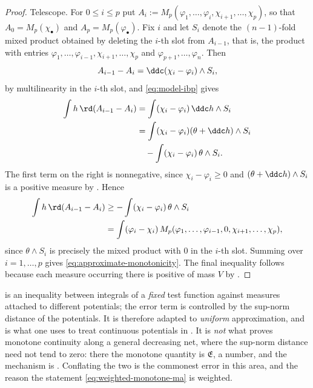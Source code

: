 \begin{proof}
Telescope.  For \(0\leq i\leq p\) put
\(A_i:=M_p(\varphi_1,\ldots,\varphi_i,\chi_{i+1},\ldots,\chi_p)\), so that
\(A_0=M_p(\chi_\bullet)\) and \(A_p=M_p(\varphi_\bullet)\).  Fix \(i\) and
let \(S_i\) denote the \((n-1)\)-fold mixed product obtained by deleting the
\(i\)-th slot from \(A_{i-1}\), that is, the product with entries
\(\varphi_1,\ldots,\varphi_{i-1},\chi_{i+1},\ldots,\chi_p\) and
\(\varphi_{p+1},\ldots,\varphi_n\).  Then
\[
 A_{i-1}-A_i=\ddc(\chi_i-\varphi_i)\wedge S_i ,
\]
by multilinearity in the \(i\)-th slot, and
\eqref{eq:model-ibp} gives
\[
 \begin{aligned}
 \int h\,\rd(A_{i-1}-A_i)
 &=\int(\chi_i-\varphi_i)\,\ddc h\wedge S_i\\
 &=\int(\chi_i-\varphi_i)(\theta+\ddc h)\wedge S_i\\
 &\quad-\int(\chi_i-\varphi_i)\,\theta\wedge S_i .
 \end{aligned}
\]
The first term on the right is nonnegative, since \(\chi_i-\varphi_i\geq0\)
and \((\theta+\ddc h)\wedge S_i\) is a positive measure by
.  Hence
\[
 \begin{aligned}
 \int h\,\rd(A_{i-1}-A_i)
 &\geq-\int(\chi_i-\varphi_i)\,\theta\wedge S_i\\
 &=\int(\varphi_i-\chi_i)\,
   M_p(\varphi_1,\ldots,\varphi_{i-1},0,
       \chi_{i+1},\ldots,\chi_p),
 \end{aligned}
\]
since \(\theta\wedge S_i\) is precisely the mixed product with \(0\) in the
\(i\)-th slot.  Summing over \(i=1,\ldots,p\) gives
\eqref{eq:approximate-monotonicity}.  The final inequality follows because
each measure occurring there is positive of mass \(V\) by
.
\end{proof}

\begin{remark}
\label{rem:ch24-two-monotonicities}
 is an inequality between integrals
of a \emph{fixed} test function against measures attached to different
potentials; the error term is controlled by the sup-norm distance of the
potentials.  It is therefore adapted to \emph{uniform} approximation, and is
what one uses to treat continuous potentials in
.  It is \emph{not} what proves monotone
continuity along a general decreasing net, where the sup-norm distance need
not tend to zero: there the monotone quantity is
\(\mathfrak E\), a number, and the mechanism is
.  Conflating the two is the commonest
error in this area, and the reason the statement
\eqref{eq:weighted-monotone-ma} is weighted.
\end{remark}

